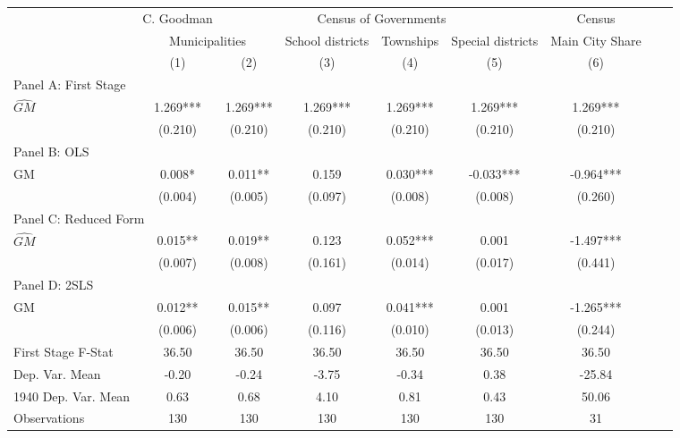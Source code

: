  \begin{tabular}{l*{8}{c}} \toprule
&\multicolumn{1}{c}{C. Goodman}&\multicolumn{4}{c}{Census of Governments}&\multicolumn{1}{c}{Census}\\\cmidrule(lr){2-2}\cmidrule(lr){3-6}\cmidrule(lr){7-7}
&\multicolumn{2}{c}{Municipalities}&\multicolumn{1}{c}{School districts}&\multicolumn{1}{c}{Townships}&\multicolumn{1}{c}{Special districts}&\multicolumn{1}{c}{Main City Share}\\\cmidrule(lr){2-3}\cmidrule(lr){4-6}\cmidrule(lr){7-7}
&\multicolumn{1}{c}{(1)}&\multicolumn{1}{c}{(2)}&\multicolumn{1}{c}{(3)}&\multicolumn{1}{c}{(4)}&\multicolumn{1}{c}{(5)}&\multicolumn{1}{c}{(6)}\\
\cmidrule(lr){1-7}
\multicolumn{6}{l}{Panel A: First Stage}\\
\cmidrule(lr){1-7}
$\widehat{GM}$  &    1.269***&    1.269***&    1.269***&    1.269***&    1.269***&    1.269***\\
                &  (0.210)   &  (0.210)   &  (0.210)   &  (0.210)   &  (0.210)   &  (0.210)   \\
\cmidrule(lr){1-7}
\multicolumn{6}{l}{Panel B: OLS}\\
\cmidrule(lr){1-7}
GM              &    0.008*  &    0.011** &    0.159   &    0.030***&   -0.033***&   -0.964***\\
                &  (0.004)   &  (0.005)   &  (0.097)   &  (0.008)   &  (0.008)   &  (0.260)   \\
\cmidrule(lr){1-7}
\multicolumn{6}{l}{Panel C: Reduced Form}\\
\cmidrule(lr){1-7}
$\widehat{GM}$  &    0.015** &    0.019** &    0.123   &    0.052***&    0.001   &   -1.497***\\
                &  (0.007)   &  (0.008)   &  (0.161)   &  (0.014)   &  (0.017)   &  (0.441)   \\
\cmidrule(lr){1-7}
\multicolumn{6}{l}{Panel D: 2SLS}\\
\cmidrule(lr){1-7}
GM              &    0.012** &    0.015** &    0.097   &    0.041***&    0.001   &   -1.265***\\
                &  (0.006)   &  (0.006)   &  (0.116)   &  (0.010)   &  (0.013)   &  (0.244)   \\
\midrule
First Stage F-Stat&    36.50   &    36.50   &    36.50   &    36.50   &    36.50   &    36.50   \\
Dep. Var. Mean  &    -0.20   &    -0.24   &    -3.75   &    -0.34   &     0.38   &   -25.84   \\
1940 Dep. Var. Mean&     0.63   &     0.68   &     4.10   &     0.81   &     0.43   &    50.06   \\
Observations    &      130   &      130   &      130   &      130   &      130   &       31   \\
       \bottomrule \end{tabular}
